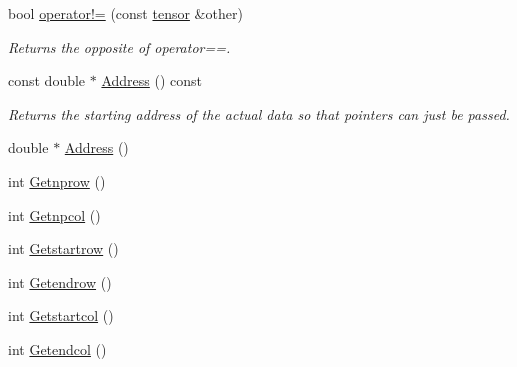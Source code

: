 \begin{DoxyCompactItemize}
bool \hyperlink{classJKBuilder_1_1tensor_a9b42dd835ddf2eb1a26b5d525b59b2b8}{operator!=} (const \hyperlink{classJKBuilder_1_1tensor}{tensor} \&other)
\begin{DoxyCompactList}\small\item\em Returns the opposite of operator==. \item\end{DoxyCompactList}\item 
const double $\ast$ \hyperlink{classJKBuilder_1_1tensor_a6a4e024f566d3bf9ba32a349afc5bbcf}{Address} () const 
\begin{DoxyCompactList}\small\item\em Returns the starting address of the actual data so that pointers can just be passed. \item\end{DoxyCompactList}\item 
double $\ast$ \hyperlink{classJKBuilder_1_1tensor_ac982d9eb84092bfc13694448dd824cbc}{Address} ()
\end{DoxyCompactItemize}
\begin{Indent}{\bf }\par
{\em \label{_amgrpd41d8cd98f00b204e9800998ecf8427e}
 }\begin{DoxyCompactItemize}
\item 
int \hyperlink{classJKBuilder_1_1DistributedMatrix_adb8ed2a17bb3d2cd8a1bb7b0d2c55b3d}{Getnprow} ()
\item 
int \hyperlink{classJKBuilder_1_1DistributedMatrix_a47943671cf60e2d66e45dbb8e83b3f73}{Getnpcol} ()
\item 
int \hyperlink{classJKBuilder_1_1DistributedMatrix_a17ad25aa4ef86883bc294bd1bd9beab2}{Getstartrow} ()
\item 
int \hyperlink{classJKBuilder_1_1DistributedMatrix_a9fe5bf62e51849a77d75cdf03144aa3a}{Getendrow} ()
\item 
int \hyperlink{classJKBuilder_1_1DistributedMatrix_a9b957ebb8465bd874870a302cb9fc1a2}{Getstartcol} ()
\item 
int \hyperlink{classJKBuilder_1_1DistributedMatrix_a800352b707ea98657805568e3c0ed8a7}{Getendcol} ()
\end{DoxyCompactItemize}
\end{Indent}
